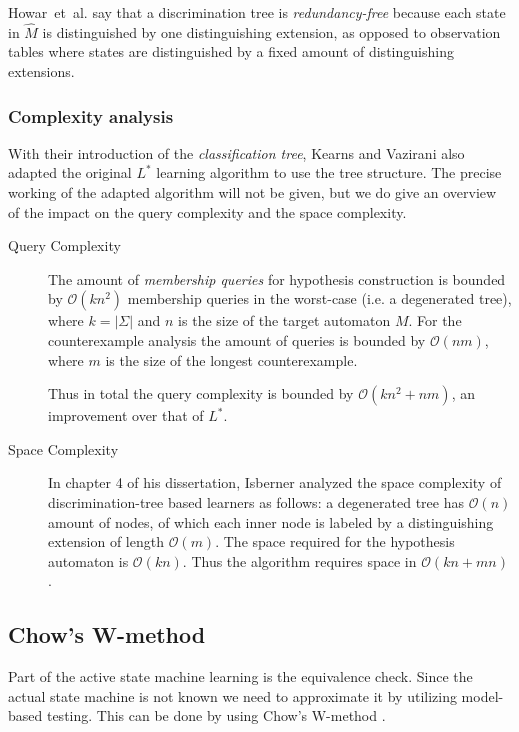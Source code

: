\documentclass[multi,crop=false,class=article]{standalone}
\begin{document}
Howar~et~al. say that a discrimination tree is \textit{redundancy-free} because
each state in $\hat M$ is distinguished by one distinguishing extension, as
opposed to observation tables where states are distinguished by a fixed amount
of distinguishing extensions\cite{Howar14}.

\subsubsection{Complexity analysis}
\label{sec:complexity-analysis}
With their introduction of the \textit{classification tree}, Kearns and Vazirani
also adapted the original $L^*$ learning algorithm to use the tree
structure\cite{Kearns94}. The precise working of the adapted algorithm will not
be given, but we do give an overview of the impact on the query complexity and
the space complexity.

\begin{description}
\item[Query Complexity] The amount of \textit{membership queries} for hypothesis
  construction is bounded by $\mathcal{O}(kn^2)$ membership queries in the
  worst-case (i.e. a degenerated tree)\cite{Howar14,Kearns94,Isberner14b}, where
  $k = |\Sigma |$ and $n$ is the size of the target automaton $M$. For the
  counterexample analysis the amount of queries is bounded by $\mathcal{O}(nm)$,
  where $m$ is the size of the longest counterexample\cite{Kearns94}.

  Thus in total the query complexity is bounded by $\mathcal{O}(kn^2 + nm)$, an
  improvement over that of $L^*$.
\item[Space Complexity] In chapter 4 of his dissertation, Isberner analyzed the
  space complexity of discrimination-tree based learners as follows: a
  degenerated tree has $\mathcal{O}(n)$ amount of nodes, of which each inner
  node is labeled by a distinguishing extension of length
  $\mathcal{O}(m)$\cite{Isberner15}.  The space required for the hypothesis
  automaton is $\mathcal{O}(kn)$\cite{Isberner15}. Thus the algorithm requires
  space in $\mathcal{O}(kn + mn)$\cite{Isberner14b,Isberner15}.
\end{description}

\subsection{Chow's W-method}
Part of the active state machine learning is the equivalence check.
Since the actual state machine is not known we need to approximate it by utilizing model-based testing.
This can be done by using Chow's W-method \cite{deRuiter15, Chow78}.
\end{document}
